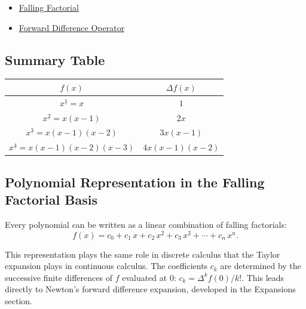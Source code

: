 \begin{dependencies}
\begin{itemize}
  \item \hyperref[def:falling-factorial]{Falling Factorial}
  \item \hyperref[def:forward-difference]{Forward Difference Operator}
\end{itemize}
\end{dependencies}

\subsection*{Summary Table}

\begin{exposition}
\begin{center}
\renewcommand{\arraystretch}{1.4}
\begin{tabular}{c|c}
\(f(x)\) & \(\Delta f(x)\) \\
\hline
\(x^{\underline{1}} = x\) & \(1\) \\
\(x^{\underline{2}} = x(x-1)\) & \(2x\) \\
\(x^{\underline{3}} = x(x-1)(x-2)\) & \(3x(x-1)\) \\
\(x^{\underline{4}} = x(x-1)(x-2)(x-3)\) & \(4x(x-1)(x-2)\)
\end{tabular}
\end{center}
\end{exposition}

\subsection*{Polynomial Representation in the Falling Factorial Basis}

\begin{exposition}
Every polynomial can be written as a linear combination of falling
factorials:
\[
f(x)
=
c_0
+ c_1\, x
+ c_2\, x^{\underline{2}}
+ c_3\, x^{\underline{3}}
+ \cdots
+ c_n\, x^{\underline{n}}.
\]
\end{exposition}

\begin{remark*}[Interpretation]
This representation plays the same role in discrete calculus that the
Taylor expansion plays in continuous calculus. The coefficients \(c_k\)
are determined by the successive finite differences of \(f\) evaluated
at \(0\): \(c_k = \Delta^k f(0) / k!\). This leads directly to Newton's
forward difference expansion, developed in the Expansions section.
\end{remark*}
